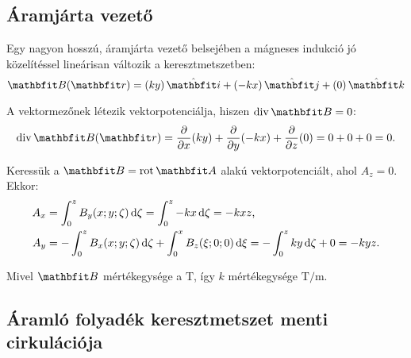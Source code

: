 \documentclass{szb-practice}
\begin{document}
\subsection{Áramjárta vezető}

Egy nagyon hosszú, áramjárta vezető belsejében a mágneses indukció jó
közelítéssel lineárisan változik a keresztmetszetben:
$$
  \rvec B(\coordv) = \ijk{ky}{-kx}{0}
$$

A vektormezőnek létezik vektorpotenciálja, hiszen $\Div \rvec B = 0$:
$$
  \Div \rvec B(\coordv)
  = \pdv{}{x}(ky) + \pdv{}{y}(-kx) + \pdv{}{z}(0)
  = 0 + 0 + 0
  = 0
  \text.
$$

Keressük a $\rvec B = \rot \rvec A$ alakú vektorpotenciált, ahol $A_z = 0$.
Ekkor:
\begin{align*}
  A_x & = \int_0^z B_y(x; y; \zeta) \mathop{}\!\mathrm{d} \zeta = \int_0^z -kx \mathop{}\!\mathrm{d} \zeta = -kxz
  \text,                                                                         \\
  A_y & = -\int_0^z B_x(x; y; \zeta) \mathop{}\!\mathrm{d} \zeta + \int_0^x B_z(\xi; 0; 0) \mathop{}\!\mathrm{d} \xi
  = -\int_0^z ky \mathop{}\!\mathrm{d} \zeta + 0 = -kyz
  \text.
\end{align*}

Mivel $\rvec B$ mértékegysége a $\si{\tesla}$, így $k$ mértékegysége
$\si{\tesla\per\meter}$.

\subsection{Áramló folyadék keresztmetszet menti cirkulációja}
\end{document}
